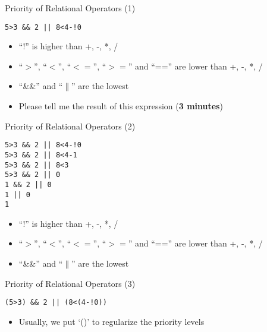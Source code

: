 \begin{frame}[fragile]{Priority of Relational Operators (1)}
\begin{center}
\begin{lstlisting}[basicstyle=\large, linewidth=0.6\textwidth]
5>3 && 2 || 8<4-!0

\end{lstlisting}
\end{center}
\begin{itemize}
	\item {``!'' is higher than +, -, *, /}
	\item {``$>$'', ``$<$'', ``$<=$'', ``$>=$'' and ``=='' are lower than +, -, *, /}
	\item {``\&\&'' and ``$\parallel$'' are the lowest}
	\item {Please tell me the result of this expression (\textbf{3 minutes})}
\end{itemize}

\end{frame}

\begin{frame}[fragile]{Priority of Relational Operators (2)}
\begin{center}
\begin{lstlisting}[basicstyle=\large, linewidth=0.6\textwidth]
5>3 && 2 || 8<4-!0
5>3 && 2 || 8<4-1
5>3 && 2 || 8<3
5>3 && 2 || 0
1 && 2 || 0
1 || 0
1
\end{lstlisting}
\end{center}
\begin{itemize}
	\item {``!'' is higher than +, -, *, /}
	\item {``$>$'', ``$<$'', ``$<=$'', ``$>=$'' and ``=='' are lower than +, -, *, /}
	\item {``\&\&'' and ``$\parallel$'' are the lowest}
\end{itemize}

\end{frame}

\begin{frame}[fragile]{Priority of Relational Operators (3)}
\begin{center}
\begin{lstlisting}[basicstyle=\large, linewidth=0.6\textwidth]
(5>3) && 2 || (8<(4-!0))
\end{lstlisting}
\end{center}
\begin{itemize}
	\item {Usually, we put `()' to regularize the priority levels}
\end{itemize}

\end{frame}

